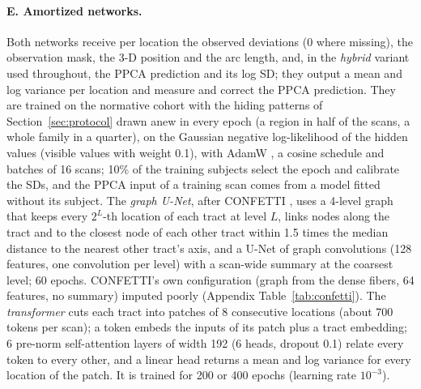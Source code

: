 \documentclass[11pt]{article}
\begin{document}
\paragraph{E. Amortized networks.} Both networks receive per location the observed deviations (0 where missing), the
observation mask, the 3-D position and the arc length, and, in the \emph{hybrid} variant used throughout, the PPCA
prediction and its log SD; they output a mean and log variance per location and measure and correct the PPCA
prediction. They are trained on the normative cohort with the hiding patterns of Section~\ref{sec:protocol} drawn anew
in every epoch (a region in half of the scans, a whole family in a quarter), on the Gaussian negative log-likelihood of
the hidden values \citep{kendall2017uncertainties} (visible values with weight 0.1), with AdamW
\citep{loshchilov2019adamw}, a cosine schedule and batches of 16 scans; 10\% of the training subjects select the epoch and
calibrate the SDs, and the PPCA input of a training scan comes from a model fitted without its subject. The
\emph{graph U-Net}, after CONFETTI \citep{confetti}, uses a 4-level graph that keeps every $2^L$-th location of each tract
at level $L$, links nodes along the tract and to the closest node of each other tract within 1.5 times the median
distance to the nearest other tract's axis, and a U-Net \citep{gao2019graphunet} of graph convolutions \citep{kipf2017gcn}
(128 features, one convolution per level) with a scan-wide summary at the coarsest level; 60 epochs. CONFETTI's own
configuration (graph from the dense fibers, 64 features, no summary) imputed poorly (Appendix
Table~\ref{tab:confetti}). The \emph{transformer} \citep{vaswani2017attention,he2022mae} cuts each tract into patches of
8 consecutive locations (about 700 tokens per scan); a token embeds the inputs of its patch plus a tract embedding; 6
pre-norm self-attention layers of width 192 (6 heads, dropout 0.1) relate every token to every other, and a linear head
returns a mean and log variance for every location of the patch. It is trained for 200 or 400 epochs (learning rate
$10^{-3}$).
\end{document}
